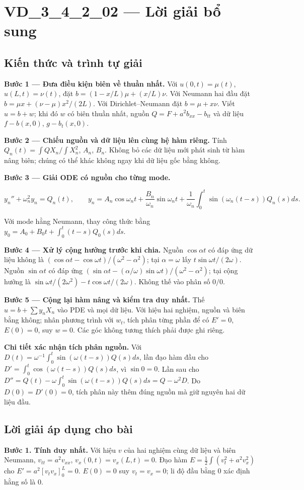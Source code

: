 \documentclass[10pt,a4paper]{article}
\begin{document}
\section*{VD\_3\_4\_2\_02 — Lời giải bổ sung}
\subsection*{Kiến thức và trình tự giải}
\textbf{Bước 1 — Đưa điều kiện biên về thuần nhất.} Với $u(0,t)=\mu(t)$, $u(L,t)=\nu(t)$, đặt $b=(1-x/L)\mu+(x/L)\nu$. Với Neumann hai đầu đặt $b=\mu x+(\nu-\mu)x^2/(2L)$. Với Dirichlet–Neumann đặt $b=\mu+x\nu$. Viết $u=b+w$; khi đó $w$ có biên thuần nhất, nguồn $Q=F+a^2b_{xx}-b_{tt}$ và dữ liệu $f-b(x,0)$, $g-b_t(x,0)$.

\textbf{Bước 2 — Chiếu nguồn và dữ liệu lên cùng hệ hàm riêng.} Tính $Q_n(t)=\int QX_n/\int X_n^2$, $A_n$, $B_n$. Không bỏ các dữ liệu mới phát sinh từ hàm nâng biên; chúng có thể khác không ngay khi dữ liệu gốc bằng không.

\textbf{Bước 3 — Giải ODE có nguồn cho từng mode.}


\[
y_n''+\omega_n^2y_n=Q_n(t),\qquad
y_n=A_n\cos\omega_nt+\frac{B_n}{\omega_n}\sin\omega_nt+\frac1{\omega_n}\int_0^t\sin(\omega_n(t-s))Q_n(s)ds.
\]


Với mode hằng Neumann, thay công thức bằng $y_0=A_0+B_0t+\int_0^t(t-s)Q_0(s)ds$.

\textbf{Bước 4 — Xử lý cộng hưởng trước khi chia.} Nguồn $\cos\alpha t$ có đáp ứng dữ liệu không là $(\cos\alpha t-\cos\omega t)/(\omega^2-\alpha^2)$; tại $\alpha=\omega$ lấy $t\sin\omega t/(2\omega)$. Nguồn $\sin\alpha t$ có đáp ứng $(\sin\alpha t-(\alpha/\omega)\sin\omega t)/(\omega^2-\alpha^2)$; tại cộng hưởng là $\sin\omega t/(2\omega^2)-t\cos\omega t/(2\omega)$. Không thế vào phân số $0/0$.

\textbf{Bước 5 — Cộng lại hàm nâng và kiểm tra duy nhất.} Thế $u=b+\sum y_nX_n$ vào PDE và mọi dữ liệu. Với hiệu hai nghiệm, nguồn và biên bằng không; nhân phương trình với $w_t$, tích phân từng phần để có $E'=0$, $E(0)=0$, suy $w=0$. Các góc không tương thích phải được ghi riêng.

\textbf{Chi tiết xác nhận tích phân nguồn.} Với $D(t)=\omega^{-1}\int_0^t\sin(\omega(t-s))Q(s)ds$, lần đạo hàm đầu cho $D'=\int_0^t\cos(\omega(t-s))Q(s)ds$, vì $\sin0=0$. Lần sau cho $D''=Q(t)-\omega\int_0^t\sin(\omega(t-s))Q(s)ds=Q-\omega^2D$. Do $D(0)=D'(0)=0$, tích phân này thêm đúng nguồn mà giữ nguyên hai dữ liệu đầu.
\subsection*{Lời giải áp dụng cho bài}
\textbf{Bước 1. Tính duy nhất.} Với hiệu $v$ của hai nghiệm cùng dữ liệu và biên Neumann, $v_{tt}=a^2v_{xx}$, $v_x(0,t)=v_x(L,t)=0$. Đạo hàm $E=\frac12\int(v_t^2+a^2v_x^2)$ cho $E'=a^2[v_tv_x]_0^L=0$. $E(0)=0$ suy $v_t=v_x=0$; li độ đầu bằng $0$ xác định hằng số là $0$.
\end{document}
